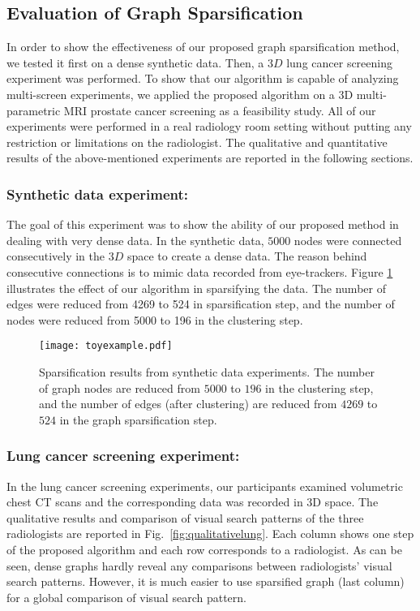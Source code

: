 \documentclass[preprint,12pt]{elsarticle}
\begin{document}
\subsection{Evaluation of Graph Sparsification}
In order to show the effectiveness of our proposed graph sparsification method, we tested it first on a dense synthetic data. Then, a $3D$ lung cancer screening experiment was performed. To show that our algorithm is capable of analyzing multi-screen experiments, we applied the proposed algorithm on a 3D multi-parametric MRI prostate cancer screening as a feasibility study. All of our experiments were performed in a real radiology room setting without putting any restriction or limitations on the radiologist. The qualitative and quantitative results of the above-mentioned experiments are reported in the following sections.


\subsubsection{Synthetic data experiment:} The goal of this experiment was to show the ability of our proposed method in dealing with very dense data. In the synthetic data, $5000$ nodes were connected consecutively in the $3D$ space to create a dense data. The reason behind consecutive connections is to mimic data recorded from eye-trackers. Figure \ref{fig:toy3d} illustrates the effect of our algorithm in sparsifying the data. The number of edges were reduced from 4269 to 524 in sparsification step, and the number of nodes were reduced from 5000 to 196 in the clustering step.


\begin{figure}[h]
\centering
\texttt{[image: toyexample.pdf]}
\caption{Sparsification results from synthetic data experiments. The number of graph nodes are reduced from $5000$ to $196$ in the clustering step, and the number of edges (after clustering) are reduced from $4269$ to $524$ in the graph sparsification step. \label{fig:toy3d}}
\end{figure}


\subsubsection{Lung cancer screening experiment:} In the lung cancer screening experiments, our participants examined volumetric chest CT scans and the corresponding data was recorded in 3D space. The qualitative results and comparison of visual search patterns of the three radiologists are reported in Fig.~\ref{fig:qualitativelung}. Each column shows one step of the proposed algorithm and each row corresponds to a radiologist. As can be seen, dense graphs hardly reveal any comparisons between radiologists' visual search patterns. However, it is much easier to use sparsified graph (last column) for a global comparison of visual search pattern.
\end{document}
